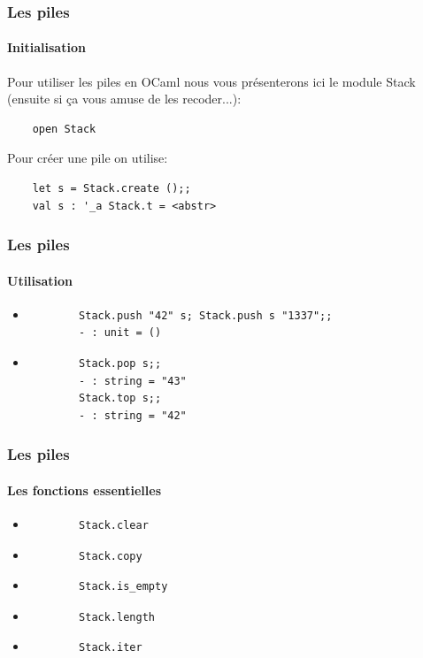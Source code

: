 \begin{frame}[fragile]
	\frametitle{Les piles}
	\framesubtitle{Initialisation}
	Pour utiliser les piles en OCaml nous vous présenterons ici le module Stack (ensuite si ça vous amuse de les recoder...):
	\begin{lstlisting}
	open Stack
	\end{lstlisting}
	Pour créer une pile on utilise:
	\begin{lstlisting}
	let s = Stack.create ();;
	val s : '_a Stack.t = <abstr>
	\end{lstlisting}
\end{frame}

\begin{frame}[fragile]
\frametitle{Les piles}
\framesubtitle{Utilisation}
	\begin{itemize}
	
	\item
		\begin{lstlisting}
		Stack.push "42" s; Stack.push s "1337";;
		- : unit = ()	
		\end{lstlisting}	
	
	\item
		\begin{lstlisting}
		Stack.pop s;;
		- : string = "43"
		Stack.top s;;
		- : string = "42"
		\end{lstlisting}	

	\end{itemize}

\end{frame}

\begin{frame}[fragile]
	\frametitle{Les piles}
	\framesubtitle{Les fonctions essentielles}
	\begin{itemize}
	
	\item
		\begin{lstlisting}
		Stack.clear
		\end{lstlisting}

	\item
		\begin{lstlisting}
		Stack.copy
		\end{lstlisting}	

	\item
		\begin{lstlisting}
		Stack.is_empty
		\end{lstlisting}	

	\item
		\begin{lstlisting}
		Stack.length
		\end{lstlisting}	

	\item
		\begin{lstlisting}
		Stack.iter
		\end{lstlisting}

	\end{itemize}

\end{frame}

